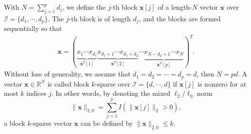 \documentclass[journal,onecolumn]{IEEEtran}
\begin{document}
With $N=\sum_{j=1}^{p}d_j$, we define the $j$-th block $\mathbf{x}[j]$ of a length-$N$ vector $\mathbf{x}$ over $\mathcal{I}=\{d_1,\cdots,d_p\}$. The $j$-th block is of length $d_j$, and the blocks are formed sequentially so that
\begin{align}
\mathbf{x}=(\underbrace{x_1\cdots x_{d_1}}_{\mathbf{x}^{T}[1]}\underbrace{x_{d_1+1}\cdots x_{d_1+d_2}}_{\mathbf{x}^{T}[2]}\cdots\underbrace{x_{N-d_p+1}\cdots x_N}_{\mathbf{x}^{T}[p]})^T. \label{signal}
\end{align}
Without loss of generality, we assume that $d_1=d_2=\cdots=d_p=d$, then $N=pd$. A vector $\mathbf{x}\in\mathbb{R}^N$ is called block $k$-sparse over $\mathcal{I}=\{d,\cdots,d\}$ if $\mathbf{x}[j]$ is nonzero for at most $k$ indices $j$. In other words, by denoting the mixed $\ell_2/\ell_0$ norm
$$
\lVert\mathbf{x}\rVert_{2,0}=\sum_{j=1}^{p}I(\lVert\mathbf{x}[j]\rVert_2>0),
$$
a block $k$-sparse vector $\mathbf{x}$ can be defined by $\lVert\mathbf{x}\rVert_{2,0}\leq k$.
\end{document}
